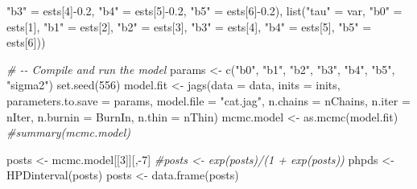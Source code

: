 \documentclass[12pt]{article}
\newenvironment{Shaded}{\begin{snugshade}}{\end{snugshade}}
\newcommand{\AttributeTok}[1]{\textcolor[rgb]{0.77,0.63,0.00}{#1}}
\newcommand{\CommentTok}[1]{\textcolor[rgb]{0.56,0.35,0.01}{\textit{#1}}}
\newcommand{\DecValTok}[1]{\textcolor[rgb]{0.00,0.00,0.81}{#1}}
\newcommand{\FloatTok}[1]{\textcolor[rgb]{0.00,0.00,0.81}{#1}}
\newcommand{\FunctionTok}[1]{\textcolor[rgb]{0.00,0.00,0.00}{#1}}
\newcommand{\NormalTok}[1]{#1}
\newcommand{\OtherTok}[1]{\textcolor[rgb]{0.56,0.35,0.01}{#1}}
\newcommand{\SpecialCharTok}[1]{\textcolor[rgb]{0.00,0.00,0.00}{#1}}
\newcommand{\StringTok}[1]{\textcolor[rgb]{0.31,0.60,0.02}{#1}}
\begin{document}
\begin{Shaded}
\begin{Highlighting}[]
                   \StringTok{"b3"} \OtherTok{=}\NormalTok{ ests[}\DecValTok{4}\NormalTok{]}\SpecialCharTok{{-}}\FloatTok{0.2}\NormalTok{, }\StringTok{"b4"} \OtherTok{=}\NormalTok{ ests[}\DecValTok{5}\NormalTok{]}\SpecialCharTok{{-}}\FloatTok{0.2}\NormalTok{, }\StringTok{"b5"} \OtherTok{=}\NormalTok{ ests[}\DecValTok{6}\NormalTok{]}\SpecialCharTok{{-}}\FloatTok{0.2}\NormalTok{),}
              \FunctionTok{list}\NormalTok{(}\StringTok{"tau"} \OtherTok{=}\NormalTok{ var, }\StringTok{"b0"} \OtherTok{=}\NormalTok{ ests[}\DecValTok{1}\NormalTok{], }\StringTok{"b1"} \OtherTok{=}\NormalTok{ ests[}\DecValTok{2}\NormalTok{], }\StringTok{"b2"} \OtherTok{=}\NormalTok{ ests[}\DecValTok{3}\NormalTok{],}
                   \StringTok{"b3"} \OtherTok{=}\NormalTok{ ests[}\DecValTok{4}\NormalTok{], }\StringTok{"b4"} \OtherTok{=}\NormalTok{ ests[}\DecValTok{5}\NormalTok{], }\StringTok{"b5"} \OtherTok{=}\NormalTok{ ests[}\DecValTok{6}\NormalTok{]))}

\CommentTok{\# {-}{-} Compile and run the model}
\NormalTok{params }\OtherTok{\textless{}{-}} \FunctionTok{c}\NormalTok{(}\StringTok{"b0"}\NormalTok{, }\StringTok{"b1"}\NormalTok{, }\StringTok{"b2"}\NormalTok{, }\StringTok{"b3"}\NormalTok{, }\StringTok{"b4"}\NormalTok{, }\StringTok{"b5"}\NormalTok{, }\StringTok{"sigma2"}\NormalTok{)}
\FunctionTok{set.seed}\NormalTok{(}\DecValTok{556}\NormalTok{)}
\NormalTok{model.fit }\OtherTok{\textless{}{-}} \FunctionTok{jags}\NormalTok{(}\AttributeTok{data =}\NormalTok{ data,}
                  \AttributeTok{inits =}\NormalTok{ inits,}
                  \AttributeTok{parameters.to.save =}\NormalTok{ params,}
                  \AttributeTok{model.file =} \StringTok{"cat.jag"}\NormalTok{,}
                  \AttributeTok{n.chains =}\NormalTok{ nChains,}
                  \AttributeTok{n.iter =}\NormalTok{ nIter,}
                  \AttributeTok{n.burnin =}\NormalTok{ BurnIn,}
                  \AttributeTok{n.thin =}\NormalTok{ nThin)}
\NormalTok{mcmc.model }\OtherTok{\textless{}{-}} \FunctionTok{as.mcmc}\NormalTok{(model.fit)}
\CommentTok{\#summary(mcmc.model)}

\NormalTok{posts }\OtherTok{\textless{}{-}}\NormalTok{ mcmc.model[[}\DecValTok{3}\NormalTok{]][,}\SpecialCharTok{{-}}\DecValTok{7}\NormalTok{] }
\CommentTok{\#posts \textless{}{-} exp(posts)/(1 + exp(posts))}
\NormalTok{phpds }\OtherTok{\textless{}{-}} \FunctionTok{HPDinterval}\NormalTok{(posts)}
\NormalTok{posts }\OtherTok{\textless{}{-}} \FunctionTok{data.frame}\NormalTok{(posts)}


\end{Highlighting}
\end{Shaded}
\end{document}
